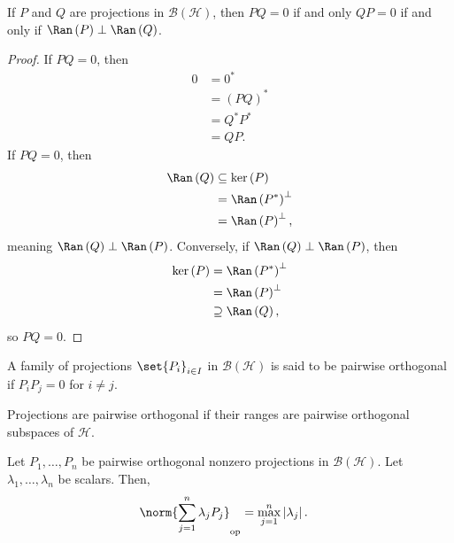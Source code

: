 \documentclass[10pt]{mypackage}
\begin{document}
\begin{lemma}
  If $P$ and $Q$ are projections in $\mathcal{B}\left(\mathcal{H}\right)$, then $PQ = 0$ if and only $QP = 0$ if and only if $\Ran\left(P\right)\perp \Ran\left(Q\right)$.
\end{lemma}
\begin{proof}
  If $PQ = 0$, then 
  \begin{align*}
    0 &= 0^{\ast}\\
      &= \left(PQ\right)^{\ast}\\
      &= Q^{\ast}P^{\ast}\\
      &= QP.
  \end{align*}
  If $PQ = 0$, then 
  \begin{align*}
    \Ran\left(Q\right) &\subseteq \ker\left(P\right)\\
                       &= \Ran\left(P^{\ast}\right)^{\perp}\\
                       &= \Ran\left(P\right)^{\perp},
  \end{align*}
  meaning $\Ran\left(Q\right) \perp \Ran\left(P\right)$. Conversely, if $\Ran\left(Q\right)\perp \Ran\left(P\right)$, then
  \begin{align*}
    \ker\left(P\right) &= \Ran\left(P^{\ast}\right)^{\perp}\\
                       &= \Ran\left(P\right)^{\perp}\\
                       &\supseteq \Ran\left(Q\right),
  \end{align*}
  so $PQ = 0$.
\end{proof}
\begin{definition}
  A family of projections $\set{P_i}_{i\in I}$ in $\mathcal{B}\left(\mathcal{H}\right)$ is said to be pairwise orthogonal if $P_iP_j = 0$ for $i \neq j$.
\end{definition}
Projections are pairwise orthogonal if their ranges are pairwise orthogonal subspaces of $\mathcal{H}$.
\begin{lemma}
  Let $P_1,\dots,P_n$ be pairwise orthogonal nonzero projections in $\mathcal{B}\left(\mathcal{H}\right)$. Let $\lambda_1,\dots,\lambda_n$ be scalars. Then,
  \begin{align*}
    \norm{\sum_{j=1}^{n}\lambda_jP_j}_{\text{op}} &= \max_{j=1}^{n}\left\vert \lambda_j \right\vert.
  \end{align*}
\end{lemma}
\end{document}
